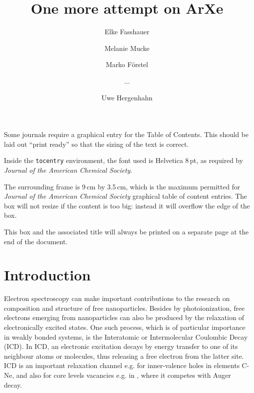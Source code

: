 \documentclass[journal=jpccck,manuscript=article]{achemso}
\author{Elke Fasshauer}
\affiliation[UIT]{Tromso, Norway}
\author{Melanie Mucke}
\author{Marko F\"orstel}
\affiliation[IPP]{Max-Planck-Institute for Plasma Physics, Boltzmannstr. 2, 85748 Garching, Germany}
\author{...}
\author{Uwe Hergenhahn}
\affiliation[IPP HGW]{Max-Planck-Institute for Plasma Physics, Wendelsteinstr. 1, 14791 Greifswald, Germany}
\title{One more attempt on ArXe}
\begin{document}
\begin{tocentry}

Some journals require a graphical entry for the Table of Contents.
This should be laid out ``print ready'' so that the sizing of the
text is correct.

Inside the \texttt{tocentry} environment, the font used is Helvetica
8\,pt, as required by \emph{Journal of the American Chemical
Society}.

The surrounding frame is 9\,cm by 3.5\,cm, which is the maximum
permitted for  \emph{Journal of the American Chemical Society}
graphical table of content entries. The box will not resize if the
content is too big: instead it will overflow the edge of the box.

This box and the associated title will always be printed on a
separate page at the end of the document.

\end{tocentry}

\begin{abstract}
\end{abstract}

\section{Introduction}
%
Electron spectroscopy can make important contributions to the research on composition and structure of free nanoparticles.\cite{jpcc} Besides by photoionization, free electrons emerging from nanoparticles can also be produced by the relaxation of electronically excited states. One such process, which is of particular importance in weakly bonded systems, is the Interatomic or Intermolecular Coulombic Decay (ICD).\cite{cederbaum} In ICD, an electronic excitation decays by energy transfer to one of its neighbour atoms or molecules, thus releasing a free electron from the latter site. ICD is an important relaxation channel e.g. for inner-valence holes in elements C-Ne, and also for core levels vacancies e.g. in , where it competes with Auger decay\cite{slavicek}. 
\end{document}
